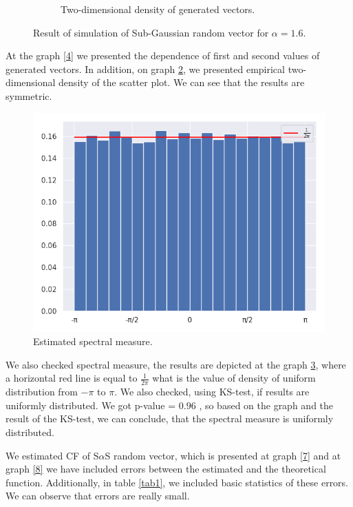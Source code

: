 \documentclass{article}
\begin{document}
\begin{figure}[H]
\begin{subfigure}{0.49\textwidth}
			\caption{Two-dimensional density of generated vectors.}\label{5}
		\end{subfigure}
		\caption{Result of simulation of Sub-Gaussian random vector for $\alpha = 1.6$.}
	\end{figure}
	
	At the graph \ref{4} we presented the dependence of first and second values of generated vectors. In addition, on graph \ref{5}, we presented empirical two-dimensional density of the scatter plot. We can see that the results are symmetric. 
	
	\begin{figure}[H]
		\centering
		\includegraphics[width=0.55\linewidth]{images/ex_2_spectral_measure}
		\caption{Estimated spectral measure.}\label{6}
	\end{figure}
	
	We also checked spectral measure, the results are depicted at the graph \ref{6}, where a horizontal red line is equal to $\frac{1}{2 \pi}$ what is the value of density of uniform distribution from $-\pi$ to $\pi$. 
	We also checked, using KS-test, if results are uniformly distributed. We got p-value = $0.96$ , so based on the graph and the result of the KS-test, we can conclude, that the spectral measure is uniformly distributed.
	
	We estimated CF of S$\alpha$S random vector, which is presented at graph \ref{7} and at graph \ref{8} we have included errors between the estimated and the theoretical function. Additionally, in table \ref{tab1}, we included basic statistics of these errors. We can observe that errors are really small.
	
\end{document}
